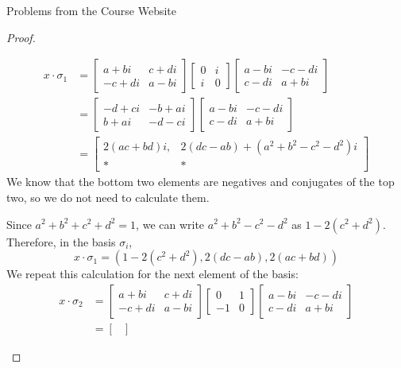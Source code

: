 \documentclass[12pt]{article}
\theoremstyle{definition}
\newenvironment{problem}[2][Problem]{\begin{trivlist}
\item[\hskip \labelsep {\bfseries #1}\hskip \labelsep {\bfseries #2.}]}{\end{trivlist}}
\begin{document}
\begin{section}{Problems from the Course Website}
\begin{problem}{3}
\begin{proof}
\begin{enumerate}[label=(\alph*)]
				\begin{align*}
				    x \cdot \sigma_1 &= \begin{bmatrix} a + bi & c + di \\ -c + di & a - bi \end{bmatrix} \begin{bmatrix} 0 & i \\ i & 0 \end{bmatrix} \begin{bmatrix} a - bi & - c - di \\ c - di & a + bi \end{bmatrix} \\
				    &= \begin{bmatrix} 
				    -d + ci & -b + ai \\ b + ai & -d - ci
				    \end{bmatrix}\begin{bmatrix} a - bi & - c - di \\ c - di & a + bi \end{bmatrix}\\
				    &= \begin{bmatrix}
				    2(ac+ bd)i, & 2(dc - ab) + (a^2 + b^2  -c^2  - d^2 )i \\ * & * 
				    \end{bmatrix}
				    \end{align*}
				    We know that the bottom two elements are negatives and conjugates of the top two, so we do not need to calculate them. 
				    \par Since $a^2 + b^2 + c^2 + d^2 = 1$, we can write $a^2 + b^2 - c^2 - d^2$ as $ 1 - 2(c^2 + d^2)$. Therefore, in the basis $\sigma_i$,
				    \[
                    x \cdot \sigma_1 = (1 - 2(c^2 + d^2), 2(dc - ab), 2(ac + bd))				    
				    \]
				    We repeat this calculation for the next element of the basis:
				    \begin{align*}
				        x \cdot \sigma_2 &= \begin{bmatrix} a + bi & c + di \\ -c + di & a - bi \end{bmatrix} \begin{bmatrix} 0 & 1 \\ -1 & 0 \end{bmatrix} \begin{bmatrix} a - bi & - c - di \\ c - di & a + bi \end{bmatrix}\\
				        &= \begin{bmatrix}

\end{bmatrix}
\end{align*}
\end{enumerate}
\end{proof}
\end{problem}
\end{section}
\end{document}
